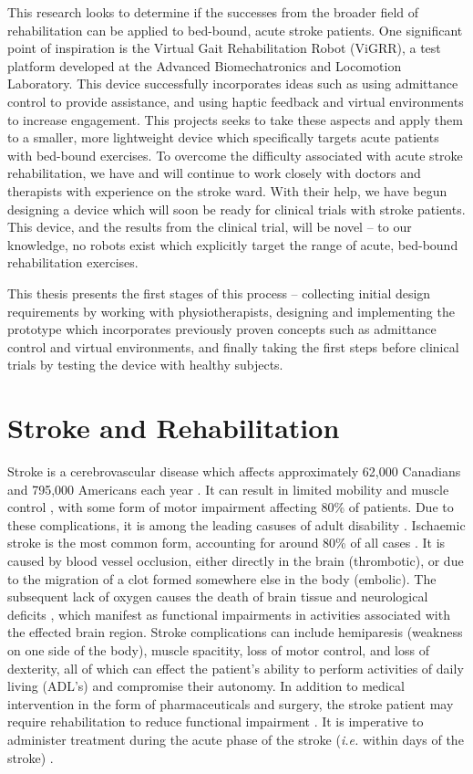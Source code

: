 \documentclass[12pt]{report}
\begin{document}
This research looks to determine if the successes from the broader field of rehabilitation can be applied to bed-bound, acute stroke patients. One significant point of inspiration is the Virtual Gait Rehabilitation Robot (ViGRR), a test platform developed at the Advanced Biomechatronics and Locomotion Laboratory. This device successfully incorporates ideas such as using admittance control to provide assistance, and using haptic feedback and virtual environments to increase engagement. This projects seeks to take these aspects and apply them to a smaller, more lightweight device which specifically targets acute patients with bed-bound exercises.  To overcome the difficulty associated with acute stroke rehabilitation, we have and will continue to work closely with doctors and therapists with experience on the stroke ward. With their help, we have begun designing a device which will soon be ready for clinical trials with stroke patients. This device, and the results from the clinical trial, will be novel -- to our knowledge, no robots exist which explicitly target the range of acute, bed-bound rehabilitation exercises.

This thesis presents the first stages of this process -- collecting initial design requirements by working with physiotherapists, designing and implementing the prototype which incorporates previously proven concepts such as admittance control and virtual environments, and finally taking the first steps before clinical trials by testing the device with healthy subjects. 


\section{Stroke and Rehabilitation}

Stroke is a cerebrovascular disease which affects approximately 62,000 Canadians and 795,000 Americans each year \cite{Benjamin2018,Hebert2016}. It can result in limited mobility and muscle control \cite{Langhorne2009}, with some form of motor impairment affecting 80\% of patients. Due to these complications, it is among the leading casuses of adult disability \cite{Ewart2003}. Ischaemic stroke is the most common form, accounting for around 80\% of all cases \cite{Rey2008}. It is caused by blood vessel occlusion, either directly in the brain (thrombotic), or due to the migration of a clot formed somewhere else in the body (embolic). The subsequent lack of oxygen causes the death of brain tissue and neurological deficits \cite{Prabhakaran2015}, which manifest as functional impairments in activities associated with the effected brain region. Stroke complications can include hemiparesis (weakness on one side of the body), muscle spacitity, loss of motor control, and loss of dexterity, all of which can effect the patient's ability to perform activities of daily living (ADL's) and compromise their autonomy. In addition to medical intervention in the form of pharmaceuticals and surgery, the stroke patient may require rehabilitation to reduce functional impairment \cite{Stroke}. It is imperative to administer treatment during the acute phase of the stroke (\textit{i.e.} within days of the stroke) \cite{Prabhakaran2015}.
\end{document}
